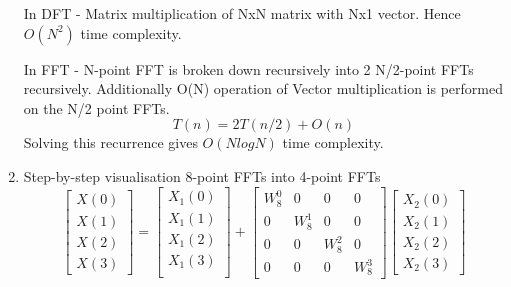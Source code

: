 \documentclass[journal,12pt,twocolumn]{IEEEtran}
\renewcommand\thesection{\arabic{section}}
\begin{document}
\begin{enumerate}[label=\thesection.\arabic*.,ref=\thesection.\theenumi]
In DFT - Matrix multiplication of NxN matrix with Nx1 vector.
Hence $O(N^2)$ time complexity.

In FFT - N-point FFT is broken down recursively into 2 N/2-point FFTs recursively.
Additionally O(N) operation of Vector multiplication is performed on the N/2 point FFTs.
\begin{equation}
    T(n) = 2T(n/2) + O(n)
\end{equation}
Solving this recurrence gives $O(NlogN)$ time complexity.

\item Step-by-step visualisation
8-point FFTs into 4-point FFTs
\begin{equation}
\begin{bmatrix}
X(0) \\ 
X(1) \\ 
X(2) \\ 
X(3)
\end{bmatrix}
=
\begin{bmatrix}
X_{1}(0) \\ 
X_{1}(1)\\ 
X_{1}(2)\\
X_{1}(3)\\
\end{bmatrix}
+
\begin{bmatrix}
W^{0}_{8} & 0 & 0 & 0\\
0 & W^{1}_{8} & 0 & 0\\
0 & 0 & W^{2}_{8} & 0\\
0 & 0 & 0 & W^{3}_{8}
\end{bmatrix}
\begin{bmatrix}
X_{2}(0) \\ 
X_{2}(1) \\ 
X_{2}(2) \\
X_{2}(3)
\end{bmatrix}
\end{equation}


\end{enumerate}
\end{document}
